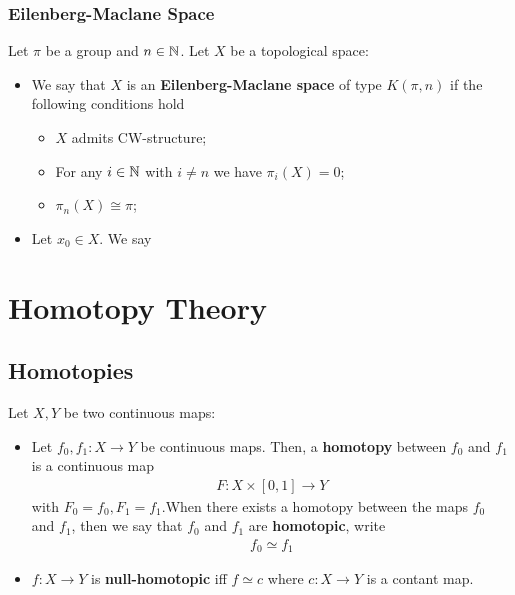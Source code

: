 \documentclass[Total.tex]{subfiles}
\begin{document}
		\subsection{Eilenberg-Maclane Space}
			\begin{Def}
				Let $\pi$ be a group and $n\in \mathbb{N}$. Let $X$ be a topological space:
				\begin{itemize}
					\item We say that $X$ is an \textbf{Eilenberg-Maclane space} of type $K(\pi,n)$ if the following conditions hold
					\begin{itemize}
						\item $X$ admits CW-structure;
						\item For any $i\in \mathbb{N}$ with $i\not=n$ we have $\pi_i(X)=0$;
						\item $\pi_n(X)\cong \pi$;
					\end{itemize}
					\item Let $x_0\in X$. We say 
				\end{itemize}
			\end{Def}
	\chapter{Homotopy Theory}
		\section{Homotopies}
			\begin{Def}
				Let $X,Y$ be two continuous maps:
				\begin{itemize}
					\item Let $f_0,f_1:X\rightarrow Y$ be continuous maps. Then, a \textbf{homotopy} between $f_0$ and $f_1$ is a continuous map
					\begin{gather*}
						F:X\times [0,1]\rightarrow Y
					\end{gather*}
					with $F_0=f_0,F_1=f_1$.When there exists a homotopy between the maps $f_0$ and $f_1$, then we say that $f_0$ and $f_1$ are \textbf{homotopic}, write
					\begin{gather*}
						f_0\simeq f_1
					\end{gather*}
					\item $f:X\rightarrow Y$ is \textbf{null-homotopic} iff $f\simeq c$ where $c:X\rightarrow Y$ is a contant map. 
				\end{itemize}
			\end{Def}
\end{document}
